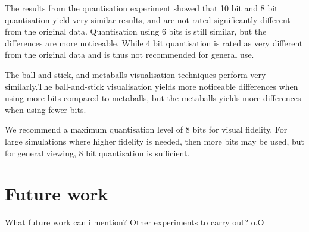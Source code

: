 The results from the quantisation experiment showed that 10 bit and 8 bit
quantisation yield very similar results, and are not rated significantly
different from the original data. Quantisation using 6 bits is still similar,
but the differences are more noticeable. While 4 bit quantisation is rated as
very different from the original data and is thus not recommended for general
use.

The ball-and-stick, and metaballs visualisation techniques perform very
similarly.The ball-and-stick visualisation yields more noticeable differences
when using more bits compared to metaballs, but the metaballs yields more
differences when using fewer bits.

We recommend a maximum quantisation level of 8 bits for visual fidelity. For
large simulations where higher fidelity is needed, then more bits may be used,
but for general viewing, 8 bit quantisation is sufficient.


\section{Future work}
\label{sec:conclusion_future}

What future work can i mention? Other experiments to carry out? o.O



